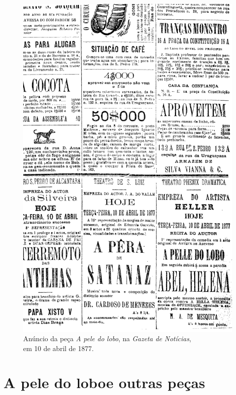 
\begin{figure}
\begin{center}
\thispagestyle{empty}
\includegraphics[width=\textwidth]{01.png}\\
{\footnotesize
Anúncio da peça \textit{A pele do lobo}, na \textit{Gazeta de Notícias},\\ em
10 de abril de 1877.}
\end{center}
\end{figure}

\part[A pele do lobo e outras peças]{A pele do lobo\break e outras peças}





%
